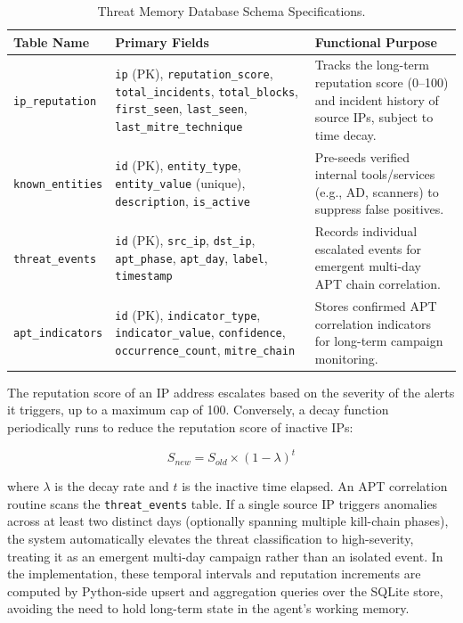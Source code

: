 \begin{table}[H]
    \centering
    \caption{Threat Memory Database Schema Specifications.}
    \label{tab:threat_memory_schema}
    \begin{tabular}{|>{\raggedright\arraybackslash}p{}|>{\raggedright\arraybackslash}p{}|>{\raggedright\arraybackslash}p{}|}
        \hline
        \textbf{Table Name} & \textbf{Primary Fields} & \textbf{Functional Purpose} \\
        \hline
        \texttt{ip\_reputation} & \texttt{ip} (PK), \texttt{reputation\_score}, \texttt{total\_incidents}, \texttt{total\_blocks}, \texttt{first\_seen}, \texttt{last\_seen}, \texttt{last\_mitre\_technique} & Tracks the long-term reputation score (0--100) and incident history of source IPs, subject to time decay. \\
        \hline
        \texttt{known\_entities} & \texttt{id} (PK), \texttt{entity\_type}, \texttt{entity\_value} (unique), \texttt{description}, \texttt{is\_active} & Pre-seeds verified internal tools/services (e.g., AD, scanners) to suppress false positives. \\
        \hline
        \texttt{threat\_events} & \texttt{id} (PK), \texttt{src\_ip}, \texttt{dst\_ip}, \texttt{apt\_phase}, \texttt{apt\_day}, \texttt{label}, \texttt{timestamp} & Records individual escalated events for emergent multi-day APT chain correlation. \\
        \hline
        \texttt{apt\_indicators} & \texttt{id} (PK), \texttt{indicator\_type}, \texttt{indicator\_value}, \texttt{confidence}, \texttt{occurrence\_count}, \texttt{mitre\_chain} & Stores confirmed APT correlation indicators for long-term campaign monitoring. \\
        \hline
    \end{tabular}
\end{table}

The reputation score of an IP address escalates based on the severity of the alerts it triggers, up to a maximum cap of 100. Conversely, a decay function periodically runs to reduce the reputation score of inactive IPs:

\begin{equation}
    S_{new} = S_{old} \times (1 - \lambda)^{t}
\end{equation}

where $\lambda$ is the decay rate and $t$ is the inactive time elapsed. An APT correlation routine scans the \texttt{threat\_events} table. If a single source IP triggers anomalies across at least two distinct days (optionally spanning multiple kill-chain phases), the system automatically elevates the threat classification to high-severity, treating it as an emergent multi-day campaign rather than an isolated event. In the implementation, these temporal intervals and reputation increments are computed by Python-side upsert and aggregation queries over the SQLite store, avoiding the need to hold long-term state in the agent's working memory.

